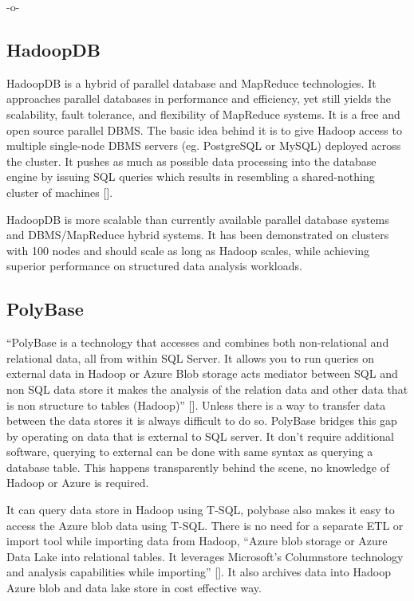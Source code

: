      -o-
   

\subsection{HadoopDB}
    
HadoopDB is a hybrid of parallel database and MapReduce
technologies. It approaches parallel databases in performance and
efficiency, yet still yields the scalability, fault tolerance, and
flexibility of MapReduce systems. It is a free and open source
parallel DBMS. The basic idea behind it is to give Hadoop access to
multiple single-node DBMS servers (eg. PostgreSQL or MySQL) deployed
across the cluster. It pushes as much as possible data processing into
the database engine by issuing SQL queries which results in resembling
a shared-nothing cluster of machines [\cite{www-hadoopdb}].

 HadoopDB is more scalable than currently available parallel database
 systems and DBMS/MapReduce hybrid systems. It has been demonstrated
 on clusters with 100 nodes and should scale as long as Hadoop scales,
 while achieving superior performance on structured data analysis
 workloads.
     
\subsection{PolyBase}

``PolyBase is a technology that accesses and combines both
non-relational and relational data, all from within SQL Server. It
allows you to run queries on external data in Hadoop or Azure Blob
storage acts mediator between SQL and non SQL data store it makes the
analysis of the relation data and other data that is non structure to
tables (Hadoop)'' [\cite{www-polybase}]. Unless there is a way to
transfer data between the data stores it is always difficult to do so.
PolyBase bridges this gap by operating on data that is external to SQL
server. It don't require additional software, querying to external can
be done with same syntax as querying a database table.  This happens
transparently behind the scene, no knowledge of Hadoop or Azure is
required.

It can query data store in Hadoop using T-SQL, polybase also makes it
easy to access the Azure blob data using T-SQL. There is no need for a
separate ETL or import tool while importing data from Hadoop, ``Azure
blob storage or Azure Data Lake into relational tables. It leverages
Microsoft's Columnstore technology and analysis capabilities while
importing'' [\cite{www-polybase}]. It also archives data into Hadoop
Azure blob and data lake store in cost effective way.

